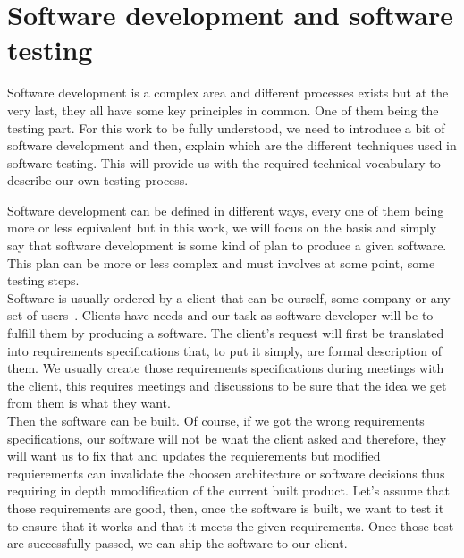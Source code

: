 \documentclass[12pt]{article}
\theoremstyle{definition}
\theoremstyle{definition}
\theoremstyle{remark}
\begin{document}


\clearpage
\part{Software development and software testing}

Software development is a complex area and different processes exists but at the very last, they all have some key principles in common. One of them being the testing part. For this work to be fully understood, we need to introduce a bit of software development and then, explain which are the different techniques used in software testing. This will provide us with the required technical vocabulary to describe our own testing process.

Software development can be defined in different ways, every one of them being more or less equivalent but in this work, we will focus on the basis and simply say that software development is some kind of plan to produce a given software. This plan can be more or less complex and must involves at some point, some testing steps.\\

Software is usually ordered by a client that can be ourself, some company or any set of users~\cite{SoftwareDevelopment:2016}. Clients have needs and our task as software developer will be to fulfill them by producing a software. The client's request will first be translated into requirements specifications that, to put it simply, are formal description of them. We usually create those requirements specifications during meetings with the client, this requires meetings and discussions to be sure that the idea we get from them is what they want.\\

Then the software can be built. Of course, if we got the wrong requirements specifications, our software will not be what the client asked and therefore, they will want us to fix that and updates the requierements but modified requierements can invalidate the choosen architecture or software decisions thus requiring in depth mmodification of the current built product. Let's assume that those requirements are good, then, once the software is built, we want to test it to ensure that it works and that it meets the given requirements. Once those test are successfully passed, we can ship the software to our client.\\
\end{document}
